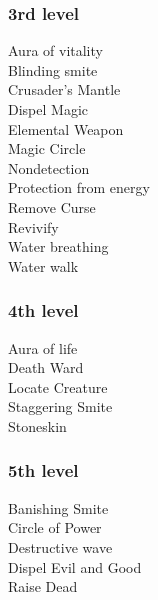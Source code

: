 \documentclass[11pt,a4paper,twocolumn]{article}
\begin{document}
	\subsubsection*{3rd level}
	Aura of vitality \\
	Blinding smite \\
	Crusader's Mantle \\
	Dispel Magic \\ 
	Elemental Weapon \\
	Magic Circle \\
	Nondetection \\
	Protection from energy \\
	Remove Curse \\
	Revivify \\
	Water breathing \\
	Water walk \\
	\subsubsection*{4th level}
	Aura of life \\
	Death Ward \\
	Locate Creature \\
	Staggering Smite \\
	Stoneskin \\
	\subsubsection*{5th level}
	Banishing Smite \\
	Circle of Power \\
	Destructive wave \\
	Dispel Evil and Good \\
	Raise Dead \\
\end{document}
